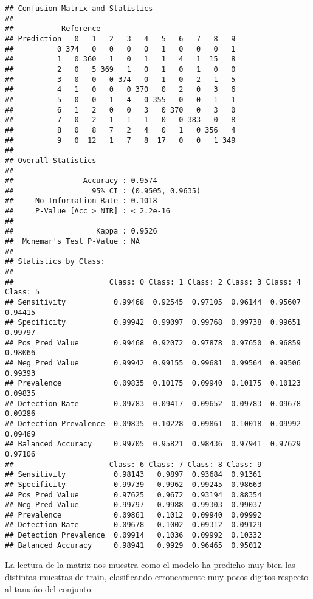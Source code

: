 \documentclass[]{article}
\begin{document}
\begin{verbatim}
## Confusion Matrix and Statistics
## 
##           Reference
## Prediction   0   1   2   3   4   5   6   7   8   9
##          0 374   0   0   0   0   1   0   0   0   1
##          1   0 360   1   0   1   1   4   1  15   8
##          2   0   5 369   1   0   1   0   1   0   0
##          3   0   0   0 374   0   1   0   2   1   5
##          4   1   0   0   0 370   0   2   0   3   6
##          5   0   0   1   4   0 355   0   0   1   1
##          6   1   2   0   0   3   0 370   0   3   0
##          7   0   2   1   1   1   0   0 383   0   8
##          8   0   8   7   2   4   0   1   0 356   4
##          9   0  12   1   7   8  17   0   0   1 349
## 
## Overall Statistics
##                                           
##                Accuracy : 0.9574          
##                  95% CI : (0.9505, 0.9635)
##     No Information Rate : 0.1018          
##     P-Value [Acc > NIR] : < 2.2e-16       
##                                           
##                   Kappa : 0.9526          
##  Mcnemar's Test P-Value : NA              
## 
## Statistics by Class:
## 
##                      Class: 0 Class: 1 Class: 2 Class: 3 Class: 4 Class: 5
## Sensitivity           0.99468  0.92545  0.97105  0.96144  0.95607  0.94415
## Specificity           0.99942  0.99097  0.99768  0.99738  0.99651  0.99797
## Pos Pred Value        0.99468  0.92072  0.97878  0.97650  0.96859  0.98066
## Neg Pred Value        0.99942  0.99155  0.99681  0.99564  0.99506  0.99393
## Prevalence            0.09835  0.10175  0.09940  0.10175  0.10123  0.09835
## Detection Rate        0.09783  0.09417  0.09652  0.09783  0.09678  0.09286
## Detection Prevalence  0.09835  0.10228  0.09861  0.10018  0.09992  0.09469
## Balanced Accuracy     0.99705  0.95821  0.98436  0.97941  0.97629  0.97106
##                      Class: 6 Class: 7 Class: 8 Class: 9
## Sensitivity           0.98143   0.9897  0.93684  0.91361
## Specificity           0.99739   0.9962  0.99245  0.98663
## Pos Pred Value        0.97625   0.9672  0.93194  0.88354
## Neg Pred Value        0.99797   0.9988  0.99303  0.99037
## Prevalence            0.09861   0.1012  0.09940  0.09992
## Detection Rate        0.09678   0.1002  0.09312  0.09129
## Detection Prevalence  0.09914   0.1036  0.09992  0.10332
## Balanced Accuracy     0.98941   0.9929  0.96465  0.95012
\end{verbatim}

La lectura de la matriz nos muestra como el modelo ha predicho muy bien
las distintas muestras de train, clasificando erroneamente muy pocos
digitos respecto al tamaño del conjunto.
\end{document}

